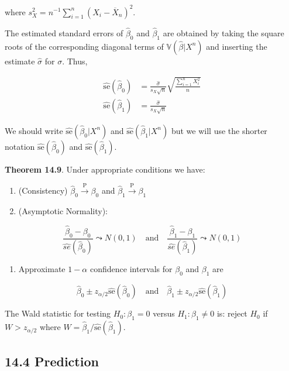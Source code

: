 where \(s_X^2 = n^{-1} \sum_{i=1}^n (X_i - \overline{X}_n)^2\).

The estimated standard errors of \(\hat{\beta}_0\) and \(\hat{\beta}_1\)
are obtained by taking the square roots of the corresponding diagonal
terms of \(\mathbb{V}(\hat{\beta} | X^n)\) and inserting the estimate
\(\hat{\sigma}\) for \(\sigma\). Thus,

\begin{align}
\hat{\text{se}}(\hat{\beta}_0) &= \frac{\hat{\sigma}}{s_X \sqrt{n}} \sqrt{\frac{\sum_{i=1}^n X_i^2}{n}}\\
\hat{\text{se}}(\hat{\beta}_1) &= \frac{\hat{\sigma}}{s_X \sqrt{n}}
\end{align}

We should write \(\hat{\text{se}}(\hat{\beta}_0 | X^n)\) and
\(\hat{\text{se}}(\hat{\beta}_1 | X^n)\) but we will use the shorter
notation \(\hat{\text{se}}(\hat{\beta}_0)\) and
\(\hat{\text{se}}(\hat{\beta}_1)\).

\textbf{Theorem 14.9}. Under appropriate conditions we have:

\begin{enumerate}[label={\arabic*.}]
\item
  (Consistency) \(\hat{\beta}_0 \xrightarrow{\text{P}} \beta_0\) and
  \(\hat{\beta}_1 \xrightarrow{\text{P}} \beta_1\)
\item
  (Asymptotic Normality):
\end{enumerate}

\[
\frac{\hat{\beta}_0 - \beta_0}{\hat{se}(\hat{\beta}_0)} \leadsto N(0, 1)
\quad \text{and} \quad
\frac{\hat{\beta}_1 - \beta_1}{\hat{se}(\hat{\beta}_1)} \leadsto N(0, 1)
\]

\begin{enumerate}[tightlist,label={\arabic*.},resume]
\item
  Approximate \(1 - \alpha\) confidence intervals for \(\beta_0\) and
  \(\beta_1\) are
\end{enumerate}

\[
\hat{\beta}_0 \pm z_{\alpha/2} \hat{\text{se}}(\hat{\beta}_0)
\quad \text{and} \quad
\hat{\beta}_1 \pm z_{\alpha/2} \hat{\text{se}}(\hat{\beta}_1)
\]

The Wald statistic for testing \(H_0 : \beta_1 = 0\) versus
\(H_1: \beta_1 \neq 0\) is: reject \(H_0\) if \(W > z_{\alpha / 2}\)
where \(W = \hat{\beta}_1 / \hat{\text{se}}(\hat{\beta}_1)\).

\subsection{14.4 Prediction}\label{prediction}

